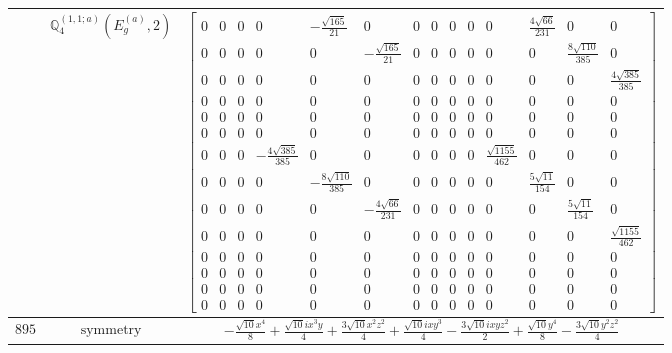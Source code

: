 \documentclass[fleqn,8pt,landscape]{jsarticle}
\begin{document}
\begin{longtable}{ccc}
$  $ & $ \mathbb{Q}_{4}^{(1,1;a)}(E_{g}^{(a)},2) $ & $ \begin{bmatrix} 0 & 0 & 0 & 0 & - \frac{\sqrt{165}}{21} & 0 & 0 & 0 & 0 & 0 & 0 & \frac{4 \sqrt{66}}{231} & 0 & 0 \\ 0 & 0 & 0 & 0 & 0 & - \frac{\sqrt{165}}{21} & 0 & 0 & 0 & 0 & 0 & 0 & \frac{8 \sqrt{110}}{385} & 0 \\ 0 & 0 & 0 & 0 & 0 & 0 & 0 & 0 & 0 & 0 & 0 & 0 & 0 & \frac{4 \sqrt{385}}{385} \\ 0 & 0 & 0 & 0 & 0 & 0 & 0 & 0 & 0 & 0 & 0 & 0 & 0 & 0 \\ 0 & 0 & 0 & 0 & 0 & 0 & 0 & 0 & 0 & 0 & 0 & 0 & 0 & 0 \\ 0 & 0 & 0 & 0 & 0 & 0 & 0 & 0 & 0 & 0 & 0 & 0 & 0 & 0 \\ 0 & 0 & 0 & - \frac{4 \sqrt{385}}{385} & 0 & 0 & 0 & 0 & 0 & 0 & \frac{\sqrt{1155}}{462} & 0 & 0 & 0 \\ 0 & 0 & 0 & 0 & - \frac{8 \sqrt{110}}{385} & 0 & 0 & 0 & 0 & 0 & 0 & \frac{5 \sqrt{11}}{154} & 0 & 0 \\ 0 & 0 & 0 & 0 & 0 & - \frac{4 \sqrt{66}}{231} & 0 & 0 & 0 & 0 & 0 & 0 & \frac{5 \sqrt{11}}{154} & 0 \\ 0 & 0 & 0 & 0 & 0 & 0 & 0 & 0 & 0 & 0 & 0 & 0 & 0 & \frac{\sqrt{1155}}{462} \\ 0 & 0 & 0 & 0 & 0 & 0 & 0 & 0 & 0 & 0 & 0 & 0 & 0 & 0 \\ 0 & 0 & 0 & 0 & 0 & 0 & 0 & 0 & 0 & 0 & 0 & 0 & 0 & 0 \\ 0 & 0 & 0 & 0 & 0 & 0 & 0 & 0 & 0 & 0 & 0 & 0 & 0 & 0 \\ 0 & 0 & 0 & 0 & 0 & 0 & 0 & 0 & 0 & 0 & 0 & 0 & 0 & 0 \end{bmatrix} $ \\ \hline
$ 895 $ & $ \text{symmetry} $ & $ - \frac{\sqrt{10} x^{4}}{8} + \frac{\sqrt{10} i x^{3} y}{4} + \frac{3 \sqrt{10} x^{2} z^{2}}{4} + \frac{\sqrt{10} i x y^{3}}{4} - \frac{3 \sqrt{10} i x y z^{2}}{2} + \frac{\sqrt{10} y^{4}}{8} - \frac{3 \sqrt{10} y^{2} z^{2}}{4} $ \\

\end{longtable}
\end{document}
